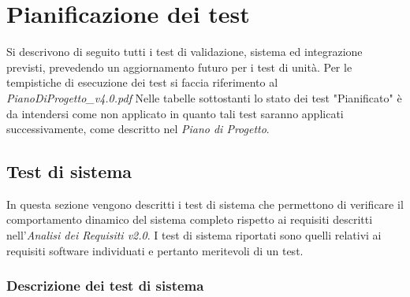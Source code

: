 \newcommand{\teststatus}{Success}

\section {Pianificazione dei test}

Si descrivono di seguito tutti i test di validazione, sistema ed integrazione previsti, prevedendo un aggiornamento futuro per i test di unità. Per le tempistiche di esecuzione dei test si faccia riferimento al \textit{PianoDiProgetto\_v4.0.pdf} Nelle tabelle sottostanti lo stato dei test "Pianificato" è da intendersi come non applicato in quanto tali test saranno applicati successivamente, come descritto nel \textit{Piano di Progetto}.

\subsection {Test di sistema}

In questa sezione vengono descritti i test di sistema che permettono di verificare il comportamento dinamico del sistema completo rispetto ai requisiti descritti nell'\textit{Analisi dei Requisiti v2.0}.
I test di sistema riportati sono quelli relativi ai requisiti software individuati e pertanto meritevoli di un test.

\subsubsection{Descrizione dei test di sistema}

